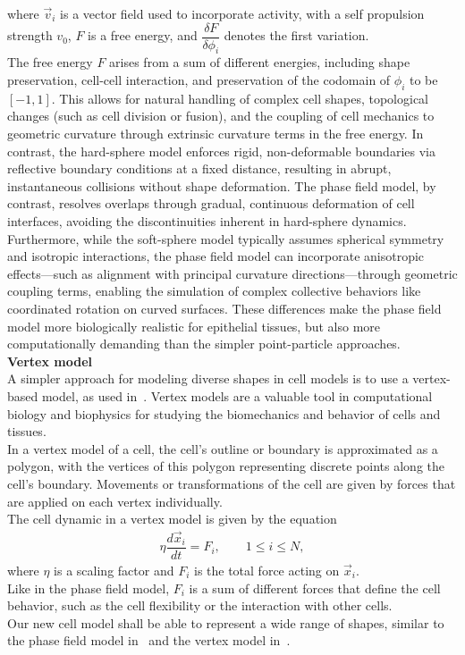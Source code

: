where $\vec{v}_i$ is a vector field used to incorporate activity, with a self propulsion strength $v_0$, $F$ is a free energy, and $\dfrac{\delta F}{\delta \phi_i}$ denotes the first variation.\\
The free energy $F$ arises from a sum of different energies, including shape preservation, cell-cell interaction, and preservation of the codomain of $\phi_i$ to be $[-1, 1]$. 
This allows for natural handling of complex cell shapes, topological changes (such as cell division or fusion), and the coupling of cell mechanics to geometric curvature through extrinsic curvature terms in the free energy. 
In contrast, the hard-sphere model enforces rigid, non-deformable boundaries via reflective boundary conditions at a fixed distance, resulting in abrupt, instantaneous collisions without shape deformation. 
The phase field model, by contrast, resolves overlaps through gradual, continuous deformation of cell interfaces, avoiding the discontinuities inherent in hard-sphere dynamics. 
Furthermore, while the soft-sphere model typically assumes spherical symmetry and isotropic interactions, the phase field model can incorporate anisotropic effects—such as alignment with principal curvature directions—through geometric coupling terms, enabling the simulation of complex collective behaviors like coordinated rotation on curved surfaces. 
These differences make the phase field model more biologically realistic for epithelial tissues, but also more computationally demanding than the simpler point-particle approaches. \\



\textbf{Vertex model} \\
A simpler approach for modeling diverse shapes in cell models is to use a vertex-based model, as used in~\cite{Fletcher14}. 
Vertex models are a valuable tool in computational biology and biophysics for studying the biomechanics and behavior of cells and tissues. \\
In a vertex model of a cell, the cell's outline or boundary is approximated as a polygon, with the vertices of this polygon representing discrete points along the cell's boundary. 
Movements or transformations of the cell are given by forces that are applied on each vertex individually. \\
The cell dynamic in a vertex model is given by the equation
\begin{align}
	\eta \dfrac{d \vec{x}_i}{dt} = F_i, \qquad 1 \leq i \leq N \label{eq:vertexmodel}, 
\end{align}
where $\eta$ is a scaling factor and $F_i$ is the total force acting on $\vec{x}_i$. \\
Like in the phase field model, $F_i$ is a sum of different forces that define the cell behavior, such as the cell flexibility or the interaction with other cells. \\
Our new cell model shall be able to represent a wide range of shapes, similar to the phase field model in~\cite{Happel2023} and the vertex model in~\cite{Fletcher14}. \\



